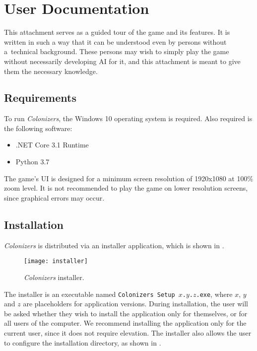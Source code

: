 \section{User Documentation}
\label{sec:userdocs}

This attachment serves as a guided tour of the game and its features.
It is written in such a way that it can be understood even by persons
without a~technical background. These persons may wish to simply
play the game without necessarily developing AI for it, and this attachment
is meant to give them the necessary knowledge.

\subsection{Requirements}

To run \emph{Colonizers}, the Windows 10 operating system is required.
Also required is the following software:
\begin{itemize}
    \item .NET Core 3.1 Runtime
    \item Python 3.7
\end{itemize}

The game's UI is designed for a minimum screen resolution of 1920x1080 at
100\% zoom level. It is not recommended to play the game on lower resolution
screens, since graphical errors may occur.

\subsection{Installation}

\emph{Colonizers} is distributed via an installer application, which is shown
in .

\begin{figure}[ht]
\centerline{\mbox{\texttt{[image: installer]}}}
\caption{\emph{Colonizers} installer.}\label{ud:installer}
\end{figure}

The installer is an executable named \texttt{Colonizers Setup $x$.$y$.$z$.exe},
where $x$, $y$ and $z$ are placeholders for application versions. During installation,
the user will be asked whether they wish to install the application only for themselves,
or for all users of the computer. We recommend installing the application
only for the current user, since it does not require elevation. The installer
also allows the user to configure the installation directory,
as shown in .

